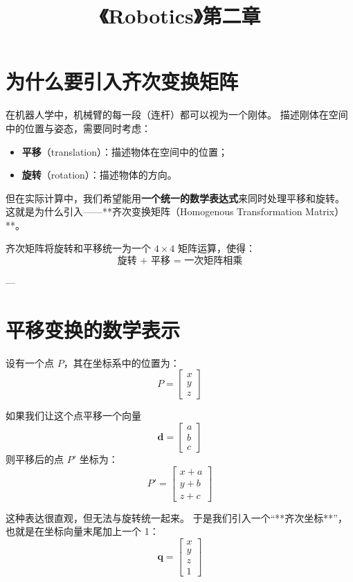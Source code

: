 \documentclass[12pt,a4paper]{article}
\title{《Robotics》第二章}
\date{}
\begin{document}
\maketitle

\section{为什么要引入齐次变换矩阵}
在机器人学中，机械臂的每一段（连杆）都可以视为一个刚体。  
描述刚体在空间中的位置与姿态，需要同时考虑：
\begin{itemize}
  \item \textbf{平移}（translation）：描述物体在空间中的位置；
  \item \textbf{旋转}（rotation）：描述物体的方向。
\end{itemize}

但在实际计算中，我们希望能用\textbf{一个统一的数学表达式}来同时处理平移和旋转。  
这就是为什么引入——**齐次变换矩阵（Homogenous Transformation Matrix）**。

齐次矩阵将旋转和平移统一为一个 \(4\times4\) 矩阵运算，使得：
\[
\text{旋转 + 平移 = 一次矩阵相乘}
\]

---

\section{平移变换的数学表示}
设有一个点 \(P\)，其在坐标系中的位置为：
\[
P = 
\begin{bmatrix}
x \\ y \\ z
\end{bmatrix}
\]

如果我们让这个点平移一个向量
\[
\boldsymbol{d} = 
\begin{bmatrix}
a \\ b \\ c
\end{bmatrix}
\]
则平移后的点 \(P'\) 坐标为：
\[
P' = 
\begin{bmatrix}
x + a \\ y + b \\ z + c
\end{bmatrix}
\]

这种表达很直观，但无法与旋转统一起来。  
于是我们引入一个“**齐次坐标**”，也就是在坐标向量末尾加上一个 1：
\[
\boldsymbol{q} = 
\begin{bmatrix}
x \\ y \\ z \\ 1
\end{bmatrix}
\]
\end{document}

